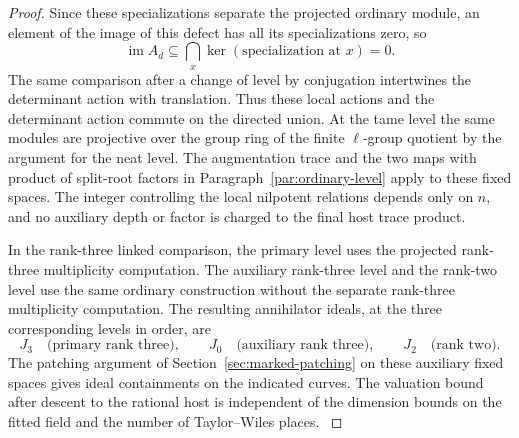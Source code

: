 \begin{proof}
Since these specializations separate the projected ordinary module, an element of the image of this defect has all its specializations zero, so
\[
 \operatorname{im} A_d\subseteq\bigcap_x\ker(\text{specialization at }x)=0 .
\] The same comparison after a change of level by conjugation intertwines the determinant action with translation. Thus these local actions and the
determinant action commute on the directed union.
At the tame level the same modules are projective over
the group ring of the finite \(\ell\)-group quotient by
the argument for the neat level. The augmentation trace
and the two maps with product of split-root factors in
Paragraph~\ref{par:ordinary-level} apply to these fixed
spaces. The integer controlling the local nilpotent relations
depends only on \(n\), and no auxiliary depth or factor is
charged to the final host trace product.

In the rank-three linked comparison, the primary level
uses the projected rank-three multiplicity computation.
The auxiliary rank-three level and the rank-two level use
the same ordinary construction without the separate
rank-three multiplicity computation. The resulting annihilator ideals, at the three corresponding levels in order, are
\[
 J_3\quad\text{(primary rank three)},\qquad J_0\quad\text{(auxiliary rank three)},\qquad J_2\quad\text{(rank two)} .
\] The patching argument of Section~\ref{sec:marked-patching} on these auxiliary fixed spaces gives ideal containments on the indicated curves. The valuation bound after descent to the
rational host is independent of the dimension bounds on the
fitted field and the number of Taylor--Wiles places.
\label{cor:ordinary-fitted-arithmetic-5}
\end{proof}
